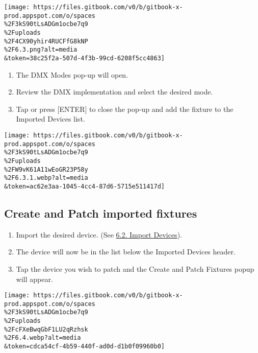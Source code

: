 \documentclass[
]{article}
\providecommand{\tightlist}{%
  \setlength{\itemsep}{0pt}\setlength{\parskip}{0pt}}
\begin{document}
\texttt{[image: https://files.gitbook.com/v0/b/gitbook-x-prod.appspot.com/o/spaces\\\%2F3kS90tLsADGm1ocbe7q9\\\%2Fuploads\\\%2F4CX90yhir4RUCFfG8kNP\\\%2F6.3.png?alt=media\\\&token=38c25f2a-507d-4f3b-99cd-6208f5cc4863]}

\begin{enumerate}
\def\labelenumi{\arabic{enumi}.}
\setcounter{enumi}{4}
\tightlist
\item
  The DMX Modes pop-up will open.
\item
  Review the DMX implementation and select the desired mode.
\item
  Tap \href{image.png}{} or press {[}ENTER{]} to close the pop-up and add the fixture to the Imported Devices list.
\end{enumerate}

\texttt{[image: https://files.gitbook.com/v0/b/gitbook-x-prod.appspot.com/o/spaces\\\%2F3kS90tLsADGm1ocbe7q9\\\%2Fuploads\\\%2FW9vK61A11wEoGR23P58y\\\%2F6.3.1.webp?alt=media\\\&token=ac62e3aa-1045-4cc4-87d6-5715e511417d]}

\hypertarget{create-and-patch-imported-fixtures}{%
\subsection{Create and Patch imported fixtures}\label{create-and-patch-imported-fixtures}}

\begin{enumerate}
\def\labelenumi{\arabic{enumi}.}
\item
  Import the desired device. (See \href{https://vibemanual.compulite.com/patch.html\#import-devices}{6.2. Import Devices}).
\item
  The device will now be in the list below the Imported Devices header.
\item
  Tap the device you wish to patch and the Create and Patch Fixtures popup will appear.
\end{enumerate}

\texttt{[image: https://files.gitbook.com/v0/b/gitbook-x-prod.appspot.com/o/spaces\\\%2F3kS90tLsADGm1ocbe7q9\\\%2Fuploads\\\%2FcFXeBwqGbF1LU2qRzhsk\\\%2F6.4.webp?alt=media\\\&token=cdca54cf-4b59-440f-ad0d-d1b0f09960b0]}
\end{document}
